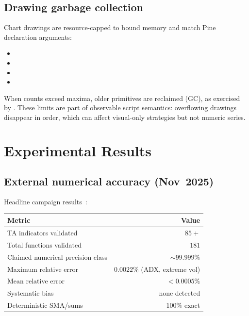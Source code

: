 \documentclass[11pt,a4paper]{article}
\begin{document}
\subsection{Drawing garbage collection}
Chart drawings are resource-capped to bound memory and match Pine declaration
arguments:
\begin{itemize}[leftmargin=*]
  \item {}
  \item {}
  \item {}
  \item {}
\end{itemize}
When counts exceed maxima, older primitives are reclaimed (GC), as exercised by
.
These limits are part of observable script semantics: overflowing drawings
disappear in order, which can affect visual-only strategies but not numeric
series.

\section{Experimental Results}
\label{sec:results}

\subsection{External numerical accuracy (Nov~2025)}
Headline campaign results~\citep{pynescript2026}:
\begin{center}
\begin{tabular}{lr}
\toprule
Metric & Value \\
\midrule
TA indicators validated & $85+$ \\
Total functions validated & $181$ \\
Claimed numerical precision class & $\sim 99.999\%$ \\
Maximum relative error & $0.0022\%$ (ADX, extreme vol) \\
Mean relative error & $<0.0005\%$ \\
Systematic bias & none detected \\
Deterministic SMA/sums & $100\%$ exact \\
\bottomrule
\end{tabular}
\end{center}
\end{document}
